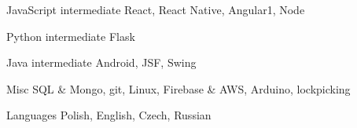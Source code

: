 
\begin{cvskills}

	\cvskill
		{JavaScript}
		{intermediate}
		{React, React Native, Angular1, Node}

	\cvskill
		{Python}
		{intermediate}
		{Flask}

	\cvskill
		{Java}
		{intermediate}
		{Android, JSF, Swing}

	\cvskill
		{Misc}
		{}
		{SQL \& Mongo, git, Linux, Firebase \& AWS, Arduino, lockpicking}

	\cvskill
		{Languages}
		{}
		{Polish, English, Czech, Russian}

\end{cvskills}
